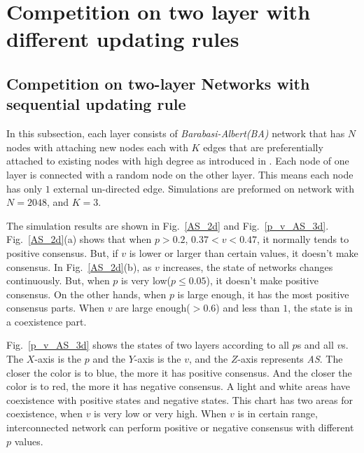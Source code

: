 
\chapter{Competition on two layer with different updating rules}
\label{chap:competition on two layer with different updating rules}
\section{Competition on two-layer Networks with sequential updating rule}
In this subsection, each layer consists of \textit{Barabasi-Albert(BA)} network that has $N$ nodes with attaching new nodes each with $K$ edges that are preferentially attached to existing nodes with high degree as introduced in \cite{barabasi1999}. Each node of one layer is connected with a random node on the other layer. This means each node has only $1$ external un-directed edge. Simulations are preformed on network with $N=2048$, and $K = 3$.

The simulation results are shown in Fig.~\ref{AS_2d} and Fig.~\ref{p_v_AS_3d}. Fig.~\ref{AS_2d}(a) shows that when $p > 0.2$, $0.37 < v < 0.47$, it normally tends to positive consensus. But, if $v$ is lower or larger than certain values, it doesn't make consensus.
In Fig.~\ref{AS_2d}(b), as $v$ increases, the state of networks changes continuously. But, when $p$ is very low($p \le 0.05$), it doesn't make positive consensus. On the other hands, when $p$ is large enough, it has the most positive consensus parts. When $v$ are large enough($>0.6$) and less than $1$, the state is in a coexistence part.


Fig.~\ref{p_v_AS_3d} shows the states of two layers according to all $p$s and all $v$s. The $X$-axis is the $p$ and the $Y$-axis is the $v$, and the $Z$-axis represents \textit{AS}. The closer the color is to blue, the more it has positive consensus. And the closer the color is to red, the more it has negative consensus. A light and white areas have coexistence with positive states and negative states. This chart has two areas for coexistence, when $v$ is very low or very high. When $v$ is in certain range, interconnected network can perform positive or negative consensus with different $p$ values. 

